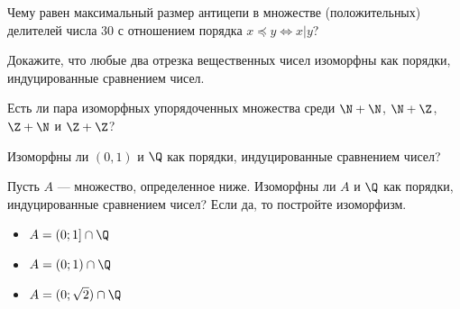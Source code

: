 \documentclass[a4paper,12pt,twoside]{article}
\begin{document}
\begin{?}
    Чему равен максимальный размер антицепи в множестве (положительных) делителей числа 30 с отношением порядка \(x \preceq y \Leftrightarrow x | y\)?
\end{?}
\begin{?}
    Докажите, что любые два отрезка вещественных чисел изоморфны как порядки, индуцированные сравнением чисел.
\end{?}
\begin{?}
    Есть ли пара изоморфных упорядоченных множества среди \(\N + \N\), \(\N + \Z\), \(\Z + \N\) и \(\Z + \Z\)?
\end{?}
\begin{?}
    Изоморфны ли \((0, 1)\) и \(\Q\) как порядки, индуцированные сравнением чисел?
\end{?}
\begin{?}
    Пусть \(A\) --- множество, определенное ниже. Изоморфны ли \(A\) и \(\Q\) как порядки, индуцированные сравнением чисел? Если да, то постройте изоморфизм.
    \begin{itemize}[noitemsep, parsep=0pt, topsep=0pt]
        \item \(A = (0; 1] \cap \Q\)
        \item  \(A = (0; 1) \cap \Q\)
        \item  \(A = (0; \sqrt{2}) \cap \Q\)
    \end{itemize}
\end{?}
\end{document}
